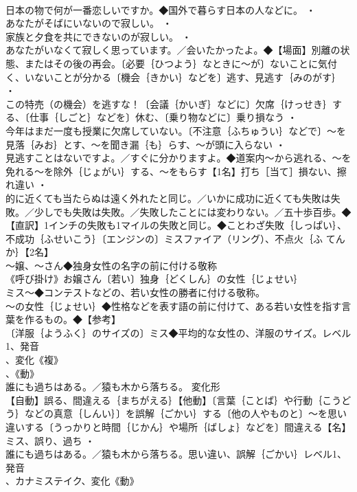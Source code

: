 \documentclass[8pt]{extreport}
\begin{document}
\begin{CJK}{UTF8}{min}
\\	日本の物で何が一番恋しいですか。◆国外で暮らす日本の人などに。 ・
\\	あなたがそばにいないので寂しい。 ・
\\	家族と夕食を共にできないのが寂しい。 ・
\\	あなたがいなくて寂しく思っています。／会いたかったよ。◆【場面】別離の状態、またはその後の再会。〔必要｛ひつよう｝なときに～が〕ないことに気付く、いないことが分かる〔機会｛きかい｝などを〕逃す、見逃す｛みのがす｝ ・
\\	この特売（の機会）を逃すな！〔会議｛かいぎ｝などに〕欠席｛けっせき｝する、〔仕事｛しごと｝などを〕休む、〔乗り物などに〕乗り損なう ・
\\	今年はまだ一度も授業に欠席していない。〔不注意｛ふちゅうい｝などで〕～を見落｛みお｝とす、～を聞き漏｛も｝らす、～が頭に入らない ・
\\	見逃すことはないですよ。／すぐに分かりますよ。◆道案内～から逃れる、～を免れる～を除外｛じょがい｝する、～をもらす【1名】打ち［当て］損ない、擦れ違い ・
\\	的に近くても当たらぬは遠く外れたと同じ。／いかに成功に近くても失敗は失敗。／少しでも失敗は失敗。／失敗したことには変わりない。／五十歩百歩。◆【直訳】1インチの失敗も1マイルの失敗と同じ。◆ことわざ失敗｛しっぱい｝、不成功｛ふせいこう｝〔エンジンの〕ミスファイア（リング）、不点火｛ふ てんか｝【2名】
\\	～嬢、～さん◆独身女性の名字の前に付ける敬称
\\	《呼び掛け》お嬢さん〔若い〕独身｛どくしん｝の女性｛じょせい｝
\\	ミス～◆コンテストなどの、若い女性の勝者に付ける敬称。
\\	～の女性｛じょせい｝◆性格などを表す語の前に付けて、ある若い女性を指す言葉を作るもの。◆【参考】
\\	〔洋服｛ようふく｝のサイズの〕ミス◆平均的な女性の、洋服のサイズ。レベル1、発音
\\	、変化《複》
\\	、《動》
\\	誰にも過ちはある。／猿も木から落ちる。	変化形 
\\	【自動】誤る、間違える｛まちがえる｝【他動】〔言葉｛ことば｝や行動｛こうどう｝などの真意｛しんい｝〕を誤解｛ごかい｝する〔他の人やものと〕～を思い違いする〔うっかりと時間｛じかん｝や場所｛ばしょ｝などを〕間違える【名】ミス、誤り、過ち ・
\\	誰にも過ちはある。／猿も木から落ちる。思い違い、誤解｛ごかい｝レベル1、発音
\\	、カナミステイク、変化《動》

\end{CJK}
\end{document}

